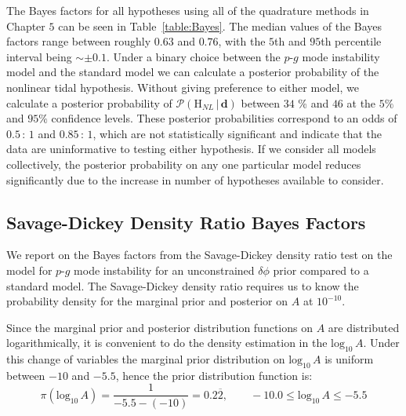 The Bayes factors for all hypotheses using all of the quadrature methods in Chapter $5$ can be seen in Table~\ref{table:Bayes}. The median values of the Bayes factors range between roughly $0.63$ and $0.76$, with the $5$th and $95$th percentile interval being $\sim \pm 0.1$. Under a binary choice between the $p$-$g$ mode instability model and the standard model we can calculate a posterior probability of the nonlinear tidal hypothesis. Without giving preference to either model, we calculate a posterior probability of $\mathcal{P}(\mathrm{H}_{NL} \, | \, \mathbf{d})$ between $34$ \%  and $46$ at the $5 \%$ and $95 \%$ confidence levels. These posterior probabilities correspond to an odds of $0.5 \, : \, 1$ and $0.85 \, : \, 1$, which are not statistically significant and indicate that the data are uninformative to testing either hypothesis. If we consider all models collectively, the posterior probability on any one particular model reduces significantly due to the increase in number of hypotheses available to consider.

\subsection{Savage-Dickey Density Ratio Bayes Factors}\label{sec:prob_density_estimator_performance}
We report on the Bayes factors from the Savage-Dickey density ratio test on the model for $p$-$g$ mode instability for an unconstrained $\delta \phi$ prior compared to a standard model. The Savage-Dickey density ratio requires us to know the probability density for the marginal prior and posterior on $A$ at $10^{-10}$.

Since the marginal prior and posterior distribution functions on $A$ are distributed logarithmically, it is convenient to do the density estimation in the $\mathrm{log}_{10} \, A$. Under this change of variables the marginal prior distribution on $\mathrm{log}_{10} \, A$ is uniform between $-10$ and $-5.5$, hence the prior distribution function is:
\begin{equation}
    \pi\left(\mathrm{log}_{10} \, A\right) = \frac{1}{-5.5 - (-10)} = 0.2\overbar{2}, \qquad -10.0 \leq \mathrm{log}_{10} \, A \leq -5.5
\end{equation}

